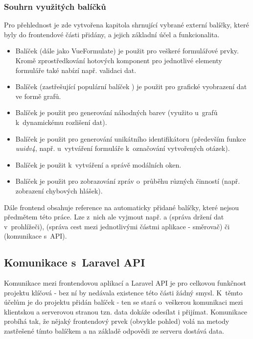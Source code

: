 		\subsubsection{Souhrn využitých balíčků}\label{sec:fe_packages}
		Pro přehlednost je zde vytvořena kapitola shrnující vybrané externí balíčky, které byly do frontendové části přidány, a jejich základní účel a funkcionalita.
		
		\begin{itemize}
			\item Balíček  (dále jako VueFormulate) je použit pro veškeré formulářové prvky. Kromě zprostředkování hotových komponent pro jednotlivé elementy formuláře také nabízí např. validaci dat.
			\item Balíček  (zastřešující populární balíček ) je použit pro grafické vyobrazení dat ve formě grafů.
			\item Balíček  je použit pro generování náhodných barev (využito u~grafů k~dynamickému rozlišení dat).
			\item Balíček  je použit pro generování unikátního identifikátoru (především funkce \textit{uuidv4}, např. u~vytváření formuláře k~označování vytvořených otázek).
			\item Balíček  je použit k~vytváření a správě modálních oken.
			\item Balíček  je použit pro zobrazování zpráv o~průběhu různých činností (např. zobrazení chybových hlášek).
		\end{itemize}
	
		Dále frontend obsahuje reference na automaticky přidané balíčky, které nejsou předmětem této práce. Lze z~nich ale vyjmout např.  a  (správa držení dat v~prohlížeči),  (správa cest mezi jednotlivými částmi aplikace - směrovač) či  (komunikace s~API).
	
	\subsection{Komunikace s~Laravel API}\label{sec:komunikace_s_api}
	Komunikace mezi frontendovou aplikací a Laravel API je pro celkovou funkčnost projektu klíčová - bez ní by nedávala existence této části žádný smysl. K~těmto účelům je do projektu přidán balíček  - ten se stará o~veškerou komunikaci mezi klientskou a serverovou stranou tzn. data dokáže odesílat i přijímat. Komunikace probíhá tak, že nějaký frontendový prvek (obvykle pohled) volá na metody zastřešené tímto balíčkem a na základě odpovědi ze serveru dostává data.
	
